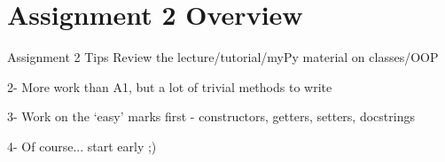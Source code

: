 \documentclass[week2]{csse1001}
\begin{document}
\section{Assignment 2 Overview}

\begin{topic}{Assignment 2 Tips}
Review the lecture/tutorial/myPy material on classes/OOP

\begin{subtopic}{2-}
More work than A1, but a lot of trivial methods to write
\end{subtopic}

\begin{subtopic}{3-}
Work on the `easy' marks first - constructors, getters, setters, docstrings
\end{subtopic}

\begin{subtopic}{4-}
Of course... start early ;)
\end{subtopic}
\end{topic}
\end{document}
